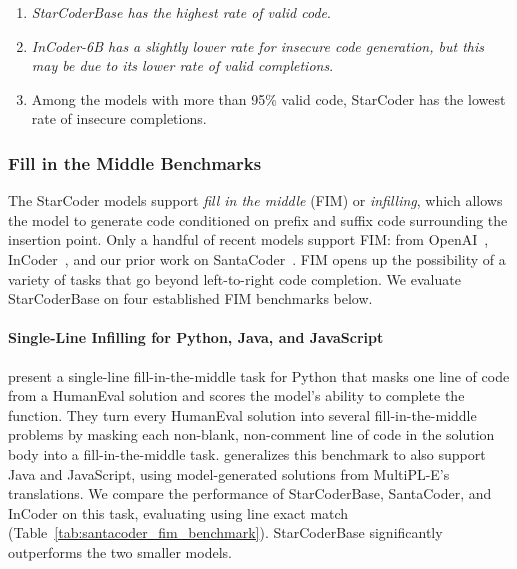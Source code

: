 \begin{enumerate}

    \item \emph{StarCoderBase has the highest rate of valid code}.

    \item \emph{InCoder-6B has a slightly lower rate for insecure code generation, but this may be due to its lower rate of valid completions}.

    \item Among the models with more than 95\% valid code, StarCoder has the lowest rate of insecure completions.

\end{enumerate}

\subsubsection{Fill in the Middle Benchmarks}

The StarCoder models support \emph{fill in the middle} (FIM) or \emph{infilling}, which allows the model to generate code conditioned on prefix and suffix code surrounding the insertion point. Only a handful of recent models support FIM: from OpenAI~\citep{bavarian2022fim}, InCoder~\citep{fried2022incoder}, and our prior work on SantaCoder~\citep{allal2023santacoder}. FIM opens up the possibility of a variety of tasks that go beyond left-to-right code completion. We evaluate StarCoderBase on four established FIM benchmarks below.

\paragraph{Single-Line Infilling for Python, Java, and JavaScript}

\citet{fried2022incoder} present a single-line fill-in-the-middle task for Python that masks one line of code from a HumanEval solution and scores the model's ability to complete the function. They turn every HumanEval solution into several fill-in-the-middle problems by masking each non-blank, non-comment line of code in the solution body into a fill-in-the-middle task.
\citet{allal2023santacoder} generalizes this benchmark to also support Java and JavaScript, using model-generated solutions from MultiPL-E's translations. We compare the performance of StarCoderBase, SantaCoder, and InCoder on this task, evaluating using line exact match (Table~\ref{tab:santacoder_fim_benchmark}). StarCoderBase significantly outperforms the two smaller models.

